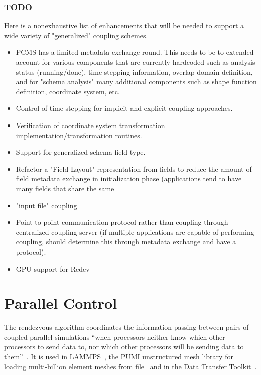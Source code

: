\documentclass[12pt]{article}
\begin{document}
\subsubsection{TODO}
Here is a nonexhaustive list of enhancements that will be needed to support a wide variety of "generalized" coupling schemes.
\begin{itemize}
    \item PCMS has a limited metadata exchange round. This needs to be to extended account for various components that are currently hardcoded such as analysis status (running/done), time stepping information, overlap domain definition, and for "schema analysis" many additional components such as shape function definition, coordinate system, etc.
    \item Control of time-stepping for implicit and explicit coupling approaches.
    \item Verification of coordinate system transformation implementation/transformation routines.
    \item Support for generalized schema field type.
    \item Refactor a "Field Layout" representation from fields to reduce the amount of field metadata exchange in initialization phase (applications tend to have many fields that share the same
    \item "input file" coupling
    \item Point to point communication protocol rather than coupling through centralized coupling server (if multiple applications are capable of performing coupling, should determine this through metadata exchange and have a protocol).
    \item GPU support for Redev
\end{itemize}


\section{Parallel Control} \label{sec:parallel control}
The rendezvous algorithm coordinates the information passing between pairs of coupled parallel simulations ``when processors neither know which other processors to send data to, nor which other processors will be sending data to them''~\cite{plimpton2021}.
It is used in LAMMPS~\cite{plimpton2021}, the PUMI unstructured mesh library for loading
multi-billion element meshes from file~\cite{rettenberger14} and in the Data Transfer
Toolkit~\cite{slatteryDataTransferKit2013}.
\end{document}
